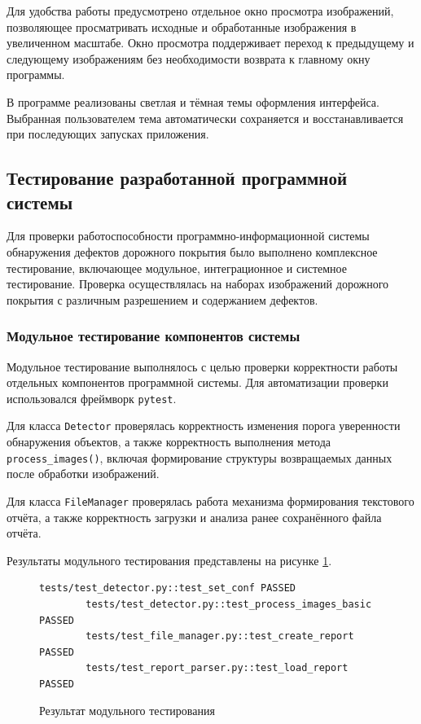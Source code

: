 Для удобства работы предусмотрено отдельное окно просмотра изображений, позволяющее просматривать исходные и обработанные изображения в увеличенном масштабе. Окно просмотра поддерживает переход к предыдущему и следующему изображениям без необходимости возврата к главному окну программы.

В программе реализованы светлая и тёмная темы оформления интерфейса. Выбранная пользователем тема автоматически сохраняется и восстанавливается при последующих запусках приложения.

\subsection{Тестирование разработанной программной системы}

Для проверки работоспособности программно-информационной системы обнаружения дефектов дорожного покрытия было выполнено комплексное тестирование, включающее модульное, интеграционное и системное тестирование. Проверка осуществлялась на наборах изображений дорожного покрытия с различным разрешением и содержанием дефектов.

\subsubsection{Модульное тестирование компонентов системы}

Модульное тестирование выполнялось с целью проверки корректности работы отдельных компонентов программной системы. Для автоматизации проверки использовался фреймворк \texttt{pytest}.

Для класса \texttt{Detector} проверялась корректность изменения порога уверенности обнаружения объектов, а также корректность выполнения метода \texttt{process\_images()}, включая формирование структуры возвращаемых данных после обработки изображений.

Для класса \texttt{FileManager} проверялась работа механизма формирования текстового отчёта, а также корректность загрузки и анализа ранее сохранённого файла отчёта.

Результаты модульного тестирования представлены на рисунке \ref{Testmod:image}.

\begin{figure}[H]
	\begin{lstlisting}[language={}]
		tests/test_detector.py::test_set_conf PASSED
		tests/test_detector.py::test_process_images_basic PASSED
		tests/test_file_manager.py::test_create_report PASSED
		tests/test_report_parser.py::test_load_report PASSED
	\end{lstlisting}  
	\caption{Результат модульного тестирования}
	\label{Testmod:image}
\end{figure}

